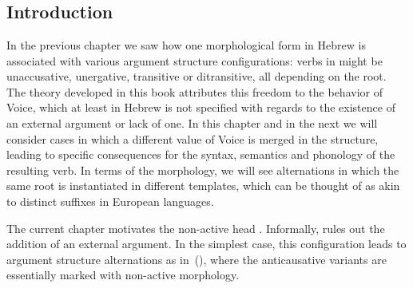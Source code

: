 \chapter{\vz}
\label{chap:vz}

\section{Introduction} \label{vz:intro}
In the previous chapter we saw how one morphological form in Hebrew is associated with various argument structure configurations: verbs in {\tkal} might be unaccusative, unergative, transitive or ditransitive, all depending on the root. The theory developed in this book attributes this freedom to the behavior of Voice, which at least in Hebrew is not specified with regards to the existence of an external argument or lack of one. In this chapter and in the next we will consider cases in which a different value of Voice is merged in the structure, leading to specific consequences for the syntax, semantics and phonology of the resulting verb. In terms of the morphology, we will see alternations in which the same root is instantiated in different templates, which can be thought of as akin to distinct suffixes in European languages.


The current chapter motivates the non-active head {\vz}. Informally, {\vz} rules out the addition of an external argument. In the simplest case, this configuration leads to argument structure alternations as in~(\nextx), where the anticausative variants are essentially marked with non-active morphology.
\ex\label{ex:anticaus}
\xe

